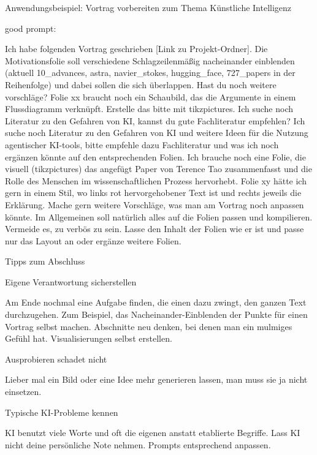 \documentclass[aspectratio=\BeamerAspectRatio]{beamer}
\newcommand{\redrow}[2]{%
  \par\noindent
  \begin{minipage}[t]{2.7cm}\vspace{0pt}%
    \raggedright\color{granat}\bfseries\strut #1\par
  \end{minipage}\hspace{5mm}%
  \begin{minipage}[t]{\dimexpr\textwidth-3.2cm\relax}\vspace{0pt}%
    \raggedright\strut #2\par
  \end{minipage}\par\vspace{2.5mm}}
\begin{document}
\begin{frame}{Anwendungsbeispiel: Vortrag vorbereiten zum Thema Künstliche Intelligenz}
\scriptsize
\redrow{good prompt:}{Ich habe folgenden Vortrag geschrieben [Link zu Projekt-Ordner]. Die Motivationsfolie soll verschiedene Schlagzeilenmäßig nacheinander einblenden (aktuell 10\_advances, astra, navier\_stokes, hugging\_face, 727\_papers in der Reihenfolge) und dabei sollen die sich überlappen. Hast du noch weitere vorschläge? Folie xx braucht noch ein Schaubild, das die Argumente in einem Flussdiagramm verknüpft. Erstelle das bitte mit tikzpictures. Ich suche noch Literatur zu den Gefahren von KI, kannst du gute Fachliteratur empfehlen? Ich suche noch Literatur zu den Gefahren von KI und weitere Ideen für die Nutzung agentischer KI-tools, bitte empfehle dazu Fachliteratur und was ich noch ergänzen könnte auf den entsprechenden Folien. Ich brauche noch eine Folie, die visuell (tikzpictures) das angefügt Paper von Terence Tao zusammenfasst und die Rolle des Menschen im wissenschaftlichen Prozess hervorhebt. Folie xy hätte ich gern in einem Stil, wo links rot hervorgehobener Text ist und rechts jeweils die Erklärung. Mache gern weitere Vorschläge, was man am Vortrag noch anpassen könnte. Im Allgemeinen soll natürlich alles auf die Folien passen und kompilieren. Vermeide es, zu verbös zu sein. Lasse den Inhalt der Folien wie er ist und passe nur das Layout an oder ergänze weitere Folien.}
\end{frame}

\begin{frame}{Tipps zum Abschluss}
\footnotesize
{}
\redrow{Eigene Verantwortung sicherstellen}{Am Ende nochmal eine Aufgabe finden, die einen dazu zwingt, den ganzen Text durchzugehen. Zum Beispiel, das Nacheinander-Einblenden der Punkte für einen Vortrag selbst machen. Abschnitte neu denken, bei denen man ein mulmiges Gefühl hat. Visualisierungen selbst erstellen. }
\redrow{Ausprobieren schadet nicht}{Lieber mal ein Bild oder eine Idee mehr generieren lassen, man muss sie ja nicht einsetzen.}
\redrow{Typische KI-Probleme kennen}{KI benutzt viele Worte und oft die eigenen anstatt etablierte Begriffe. Lass KI nicht deine persönliche Note nehmen. Prompts entsprechend anpassen.}
\end{frame}
\end{document}
